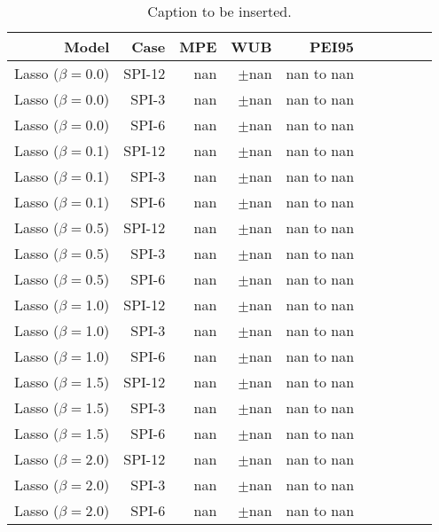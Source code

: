 \begin{table}
\centering
\caption{Caption to be inserted.}
\label{uncertainty_table__models}
\begin{tabular}{rrrrrrrrrr}
\toprule
                 Model &    Case &  MPE &       WUB &       PEI95 \\
\midrule
 Lasso ($\beta = $0.0) &  SPI-12 &  nan &  $\pm$nan &  nan to nan \\
 Lasso ($\beta = $0.0) &   SPI-3 &  nan &  $\pm$nan &  nan to nan \\
 Lasso ($\beta = $0.0) &   SPI-6 &  nan &  $\pm$nan &  nan to nan \\
 Lasso ($\beta = $0.1) &  SPI-12 &  nan &  $\pm$nan &  nan to nan \\
 Lasso ($\beta = $0.1) &   SPI-3 &  nan &  $\pm$nan &  nan to nan \\
 Lasso ($\beta = $0.1) &   SPI-6 &  nan &  $\pm$nan &  nan to nan \\
 Lasso ($\beta = $0.5) &  SPI-12 &  nan &  $\pm$nan &  nan to nan \\
 Lasso ($\beta = $0.5) &   SPI-3 &  nan &  $\pm$nan &  nan to nan \\
 Lasso ($\beta = $0.5) &   SPI-6 &  nan &  $\pm$nan &  nan to nan \\
 Lasso ($\beta = $1.0) &  SPI-12 &  nan &  $\pm$nan &  nan to nan \\
 Lasso ($\beta = $1.0) &   SPI-3 &  nan &  $\pm$nan &  nan to nan \\
 Lasso ($\beta = $1.0) &   SPI-6 &  nan &  $\pm$nan &  nan to nan \\
 Lasso ($\beta = $1.5) &  SPI-12 &  nan &  $\pm$nan &  nan to nan \\
 Lasso ($\beta = $1.5) &   SPI-3 &  nan &  $\pm$nan &  nan to nan \\
 Lasso ($\beta = $1.5) &   SPI-6 &  nan &  $\pm$nan &  nan to nan \\
 Lasso ($\beta = $2.0) &  SPI-12 &  nan &  $\pm$nan &  nan to nan \\
 Lasso ($\beta = $2.0) &   SPI-3 &  nan &  $\pm$nan &  nan to nan \\
 Lasso ($\beta = $2.0) &   SPI-6 &  nan &  $\pm$nan &  nan to nan \\
\bottomrule
\end{tabular}
\end{table}
